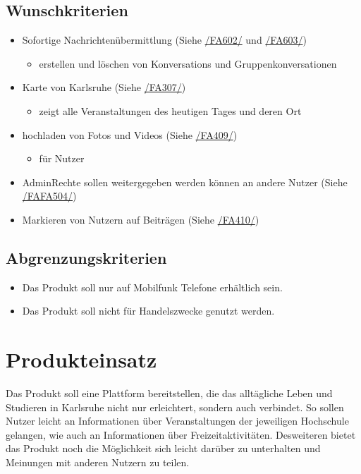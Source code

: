 \documentclass[parskip=full]{scrartcl}
\begin{document}
		\subsection{Wunschkriterien}
		\begin{itemize}[nosep] 
			\item Sofortige Nachrichtenübermittlung (Siehe \hyperref[sec:FA602]{/FA602/} und \hyperref[sec:FA603]{/FA603/})
			\begin{itemize}
				\item erstellen und löschen von \glspl{Konversation} und Gruppenkonversationen
			\end{itemize}
			
			\item Karte von Karlsruhe (Siehe \hyperref[sec:FA307]{/FA307/})
			\begin{itemize}
				\item zeigt alle Veranstaltungen des heutigen Tages und deren Ort
			\end{itemize}
			\item hochladen von Fotos und Videos (Siehe \hyperref[sec:FA409]{/FA409/})
			\begin{itemize}
				\item für Nutzer
			\end{itemize}
			\item \gls{AdminRechte} sollen weitergegeben werden können an andere Nutzer 
			(Siehe \hyperref[sec:FA504]{/FAFA504/})
			\item Markieren von Nutzern auf Beiträgen (Siehe \hyperref[sec:FA410]{/FA410/})
		\end{itemize}
		
		\newpage
		\subsection{Abgrenzungskriterien}
		\begin{itemize}
			\item Das Produkt soll nur auf Mobilfunk Telefone erhältlich sein.
			\item Das Produkt soll nicht für Handelszwecke genutzt werden.
		\end{itemize}
		\newpage
		
		
		\section{Produkteinsatz}
		Das Produkt soll eine Plattform bereitstellen, die das alltägliche Leben und Studieren in Karlsruhe nicht nur erleichtert, sondern auch verbindet. So sollen Nutzer leicht an Informationen über Veranstaltungen der jeweiligen Hochschule gelangen, wie auch an Informationen über Freizeitaktivitäten. Desweiteren bietet das Produkt noch die Möglichkeit sich leicht darüber zu unterhalten und Meinungen mit anderen Nutzern zu teilen.
		
\end{document}
